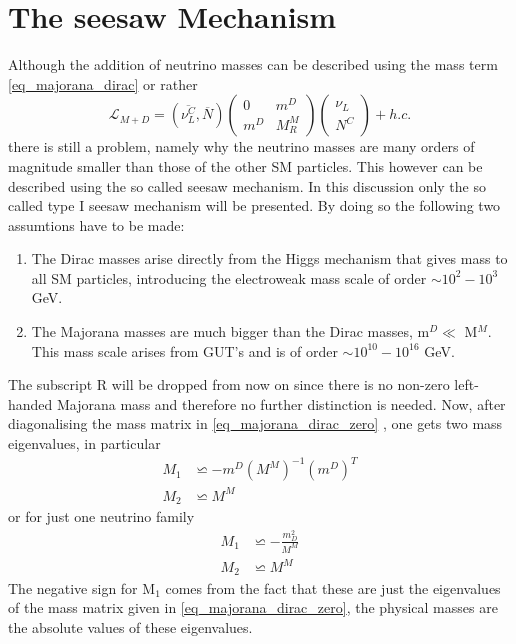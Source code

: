 \section{The seesaw Mechanism}
Although the addition of neutrino masses can be described using the mass term \ref{eq_majorana_dirac} or rather
\begin{equation}
\mathcal{L}_{M+D}=\left(\overline{\nu^C_L},\overline{N}\right)	\left(\begin{array}{cc}0&m^D\\m^D&M^M_R\end{array}\right)	\left(\begin{array}{c}\nu_L\\N^C\end{array}\right)+h.c.
\label{eq_majorana_dirac_zero}
\end{equation}
there is still a problem, namely why the neutrino masses are many orders of magnitude smaller than those of the other SM particles. This however can be described using the so called seesaw mechanism. In this discussion only the so called type I seesaw mechanism will be presented. By doing so the following two assumtions have to be made:
\begin{enumerate}
	\item The Dirac masses arise directly from the Higgs mechanism that gives mass to all SM particles, introducing the electroweak mass scale of order $\sim10^2-10^3$ GeV.
	\item The Majorana masses are much bigger than the Dirac masses, m$^D\ll$ M$^M$. This mass scale arises from GUT's and is of order $\sim10^{10}-10^{16}$ GeV.
\end{enumerate}
The subscript R will be dropped from now on since there is no non-zero left-handed Majorana mass and therefore no further distinction is needed.\newline
Now, after diagonalising the mass matrix in \ref{eq_majorana_dirac_zero} \cite[pp. 2-3]{Lindner:2001hr}, one gets two mass eigenvalues, in particular
\begin{align*}
	M_1&\backsimeq-m^D{\left(M^M\right)}^{-1}{\left(m^D\right)}^{T}\\
	M_2&\backsimeq M^M
\end{align*}
or for just one neutrino family
\begin{align}
	M_1&\backsimeq -\frac{m_D^2}{M^M}
	\label{eq:light_neutrino}
	\\
	M_2&\backsimeq M^M
	\label{eq:heavy_neutrino}
\end{align}
The negative sign for M$_1$ comes from the fact that these are just the eigenvalues of the mass matrix given in \ref{eq_majorana_dirac_zero}, the physical masses are the absolute values of these eigenvalues. \newline
